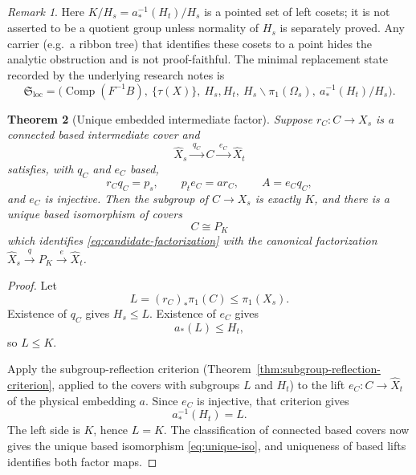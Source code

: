 \documentclass[11pt,reqno]{amsart}
\newtheorem{theorem}{Theorem}[section]
\theoremstyle{definition}
\theoremstyle{remark}
\newtheorem{remark}[theorem]{Remark}
\begin{document}
\begin{remark}\label{rem:coset-set}
Here \(K/H_s=a_*^{-1}(H_t)/H_s\) is a pointed set of left cosets; it is not asserted to be a quotient group unless normality of \(H_s\) is separately proved.  Any carrier (e.g.\ a ribbon tree) that identifies these cosets to a point hides the analytic obstruction and is not proof-faithful.  The minimal replacement state recorded by the underlying research notes is
\[
 \mathfrak S_{\mathrm{loc}}=\bigl(\operatorname{Comp}(F^{-1}B),\ \{\tau(X)\},\ H_s,H_t,\ H_s\backslash\pi_1(\Omega_s),\ a_*^{-1}(H_t)/H_s\bigr).  \tag{9.1}
\]
\end{remark}
\begin{theorem}[Unique embedded intermediate factor]\label{thm:unique-intermediate}
Suppose \( r_C\colon C\to X_s \) is a connected based intermediate cover and
\begin{equation}\label{eq:candidate-factorization}
  \widehat X_s\xrightarrow{\;q_C\;}C\xrightarrow{\;e_C\;}\widehat X_t
\end{equation}
satisfies, with \( q_C \) and \( e_C \) based,
\begin{equation}\label{eq:candidate-compat}
  r_Cq_C=p_s,\qquad p_te_C=ar_C,\qquad A=e_Cq_C,
\end{equation}
and \( e_C \) is injective.  Then the subgroup of \( C\to X_s \) is exactly \( K \), and there is a unique based isomorphism of covers
\begin{equation}\label{eq:unique-iso}
  C\cong P_K
\end{equation}
which identifies \eqref{eq:candidate-factorization} with the canonical factorization \( \widehat X_s\xrightarrow{q}P_K\xrightarrow{e}\widehat X_t \).
\end{theorem}

\begin{proof}
Let
\[
  L=(r_C)_*\pi_1(C)\leq\pi_1(X_s).
\]
Existence of \( q_C \) gives \( H_s\leq L \).  Existence of \( e_C \) gives
\[
  a_*(L)\leq H_t,
\]
so \( L\leq K \).

Apply the subgroup-reflection criterion (Theorem~\ref{thm:subgroup-reflection-criterion}, applied to the covers with subgroups \( L \) and \( H_t \)) to the lift \( e_C\colon C\to\widehat X_t \) of the physical embedding \( a \).  Since \( e_C \) is injective, that criterion gives
\[
  a_*^{-1}(H_t)=L .
\]
The left side is \( K \), hence \( L=K \).  The classification of connected based covers now gives the unique based isomorphism \eqref{eq:unique-iso}, and uniqueness of based lifts identifies both factor maps.
\end{proof}
\end{document}
